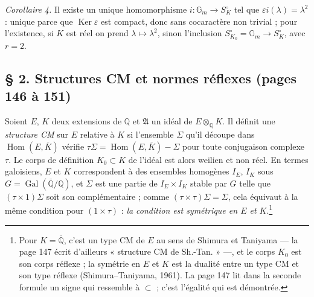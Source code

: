 \documentclass[11pt,a4paper]{article}
\begin{document}
\emph{Corollaire 4.} Il existe un unique homomorphisme $i \colon \mathbb{G}_{m}
\to S^{\circ}_{K}$ tel que $\varepsilon i(\lambda) = \lambda^{2}$ : unique parce
que $\operatorname{Ker}\varepsilon$ est compact, donc sans cocaractère non
trivial ; pour l'existence, si $K$ est réel on prend $\lambda \mapsto
\lambda^{2}$, sinon l'inclusion $S^{\circ}_{K_{0}} = \mathbb{G}_{m} \to
S^{\circ}_{K}$, avec $r = 2$.

\subsection*{§ 2. Structures CM et normes réflexes (pages 146 à 151)}

Soient $E$, $K$ deux extensions de $\mathbb{Q}$ et $\mathfrak{A}$ un idéal de
$E \otimes_{\mathbb{Q}} K$. Il définit une \emph{structure CM} sur $E$ relative à
$K$ si l'ensemble $\Sigma$ qu'il découpe dans $\operatorname{Hom}(E,
\overline{K})$ vérifie $\tau\Sigma = \operatorname{Hom}(E, \overline{K}) - \Sigma$
pour toute conjugaison complexe $\tau$. Le corps de définition $K_{0} \subset K$
de l'idéal est alors weilien et non réel. En termes galoisiens, $E$ et $K$
correspondent à des ensembles homogènes $I_{E}$, $I_{K}$ sous $G =
\operatorname{Gal}(\overline{\mathbb{Q}}/\mathbb{Q})$, et $\Sigma$ est une partie
de $I_{E} \times I_{K}$ stable par $G$ telle que $(\tau \times 1)\Sigma$ soit son
complémentaire ; comme $(\tau \times \tau)\Sigma = \Sigma$, cela équivaut à la
même condition pour $(1 \times \tau)$ : \emph{la condition est symétrique en $E$
et $K$}.\footnote{Pour $K = \overline{\mathbb{Q}}$, c'est un type CM de $E$ au sens
de Shimura et Taniyama --- la page 147 écrit d'ailleurs « structure CM de
Sh.-Tan. » ---, et le corps $K_{0}$ est son corps réflexe ; la symétrie en $E$ et
$K$ est la dualité entre un type CM et son type réflexe (Shimura--Taniyama,
1961). La page 147 lit dans la seconde formule un signe qui ressemble à
$\subset$ ; c'est l'égalité qui est démontrée.}
\end{document}
